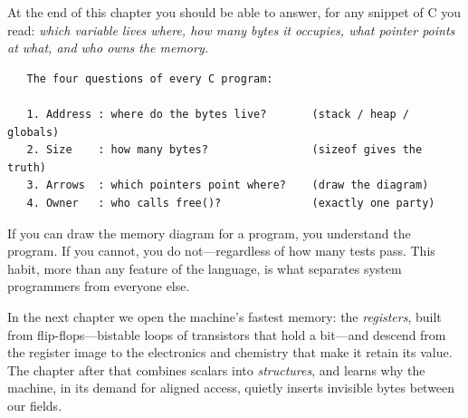 At the end of this chapter you should be able to answer, for any
snippet of C you read: \emph{which variable lives where, how many bytes
it occupies, what pointer points at what, and who owns the memory.}

\begin{verbatim}
   The four questions of every C program:

   1. Address : where do the bytes live?       (stack / heap / globals)
   2. Size    : how many bytes?                (sizeof gives the truth)
   3. Arrows  : which pointers point where?    (draw the diagram)
   4. Owner   : who calls free()?              (exactly one party)
\end{verbatim}

If you can draw the memory diagram for a program, you understand the
program. If you cannot, you do not---regardless of how many tests pass.
This habit, more than any feature of the language, is what separates
system programmers from everyone else.

In the next chapter we open the machine's fastest memory: the
\emph{registers}, built from flip-flops---bistable loops of
transistors that hold a bit---and descend from the register image to
the electronics and chemistry that make it retain its value. The
chapter after that combines scalars into \emph{structures}, and
learns why the machine, in its demand for aligned access, quietly
inserts invisible bytes between our fields.
